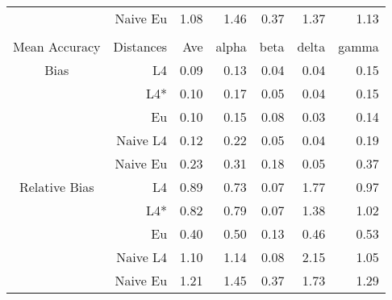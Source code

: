 \documentclass[a4paper,12pt,twoside]{book}
\begin{document}
\begin{table}[H]
\begin{tabular}{crrrrrr}
&Naive Eu &     1.08 & 1.46 & 0.37 & 1.37 & 1.13 \\ 
   \\ 
   \hline
{\color{blue}Mean Accuracy} & Distances & Ave & alpha & beta & delta & gamma \\ 
  \hline
{\color{blue}Bias} & L4  &0.09 & 0.13 & 0.04 & 0.04 & 0.15 \\ 
  
&L4*  &0.10 & 0.17 & 0.05 & 0.04 & 0.15 \\ 
  
  
&Eu &  0.10 & 0.15 & 0.08 & 0.03 & 0.14 \\ 
  
&Naive L4&  
     0.12 & 0.22 & 0.05 & 0.04 & 0.19 \\ 
  
&Naive Eu &  0.23 & 0.31 & 0.18 & 0.05 & 0.37 \\ 
  
  
   \hline
   
{\color{blue} Relative Bias } & L4  &0.89 & 0.73 & 0.07 & 1.77 & 0.97 \\ 
  
&L4*  &0.82 & 0.79 & 0.07 & 1.38 & 1.02 \\ 
 
  
&Eu &  
     0.40 & 0.50 & 0.13 & 0.46 & 0.53 \\ 
 
&Naive L4&  
  
 1.10 & 1.14 & 0.08 & 2.15 & 1.05 \\ 
  
&Naive Eu &  
   1.21 & 1.45 & 0.37 & 1.73 & 1.29 \\ 
  
  
  
\end{tabular}

\end{table}
\end{document}
